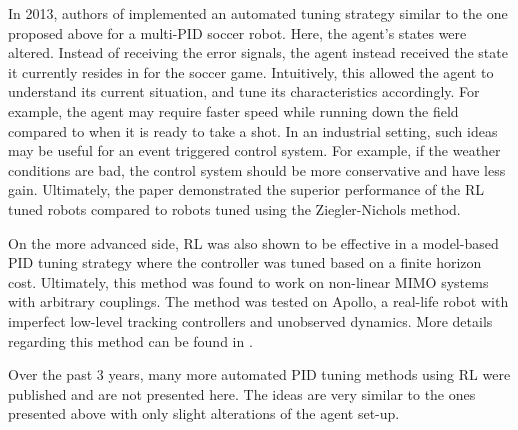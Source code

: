 In 2013, authors of \cite{pid6} implemented an automated tuning strategy similar to the one proposed above for a multi-PID soccer robot. Here, the agent's states were altered.  Instead of receiving the error signals, the agent instead received the state it currently resides in for the soccer game. Intuitively, this allowed the agent to understand its current situation, and tune its characteristics accordingly.  For example, the agent may require faster speed while running down the field compared to when it is ready to take a shot.  In an industrial setting, such ideas may be useful for an event triggered control system.  For example, if the weather conditions are bad, the control system should be more conservative and have less gain. Ultimately, the paper demonstrated the superior performance of the RL tuned robots compared to robots tuned using the Ziegler-Nichols method.

On the more advanced side, RL was also shown to be effective in a model-based PID tuning strategy where the controller was tuned based on a finite horizon cost. Ultimately, this method was found to work on non-linear MIMO systems with arbitrary couplings. The method was tested on Apollo, a real-life robot with imperfect low-level tracking controllers and unobserved dynamics. More details regarding this method can be found in \cite{pid7}.

Over the past 3 years, many more automated PID tuning methods using RL were published and are not presented here.  The ideas are very similar to the ones presented above with only slight alterations of the agent set-up.















